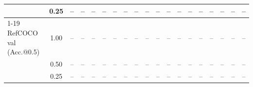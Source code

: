\begin{table}[t]
{\begin{tabular}{l c | c c c c | c c c c | c c | c c c | c c c c}
 & 0.25 & -- & -- & -- & -- & -- & -- & -- & -- & -- & -- & -- & -- & -- & -- & -- & -- & -- \\
\cmidrule(lr){1-19}
RefCOCO val (Acc.@0.5) & 1.00 & -- & -- & -- & -- & -- & -- & -- & -- & -- & -- & -- & -- & -- & -- & -- & -- & -- \\
 & 0.50 & -- & -- & -- & -- & -- & -- & -- & -- & -- & -- & -- & -- & -- & -- & -- & -- & -- \\
 & 0.25 & -- & -- & -- & -- & -- & -- & -- & -- & -- & -- & -- & -- & -- & -- & -- & -- & -- \\
\bottomrule
\end{tabular}}
\end{table}
